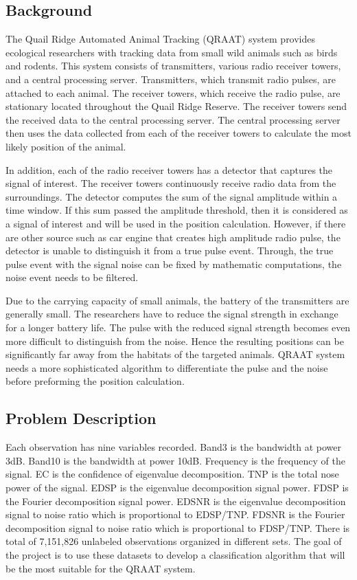 \documentclass[twoside]{article}
\begin{document}
\subsection{Background}
The Quail Ridge Automated Animal Tracking (QRAAT) system provides ecological researchers with tracking data from small wild animals such as birds and rodents. This system consists of transmitters, various radio receiver towers, and a central processing server. Transmitters, which transmit radio pulses, are attached to each animal. The receiver towers, which receive the radio pulse, are stationary located throughout the Quail Ridge Reserve. The receiver towers send the received data to the central processing server. The central processing server then uses the data collected from each of the receiver towers to calculate the most likely position of the animal. 

In addition, each of the radio receiver towers has a detector that captures the signal of interest. The receiver towers continuously receive radio data from the surroundings. The detector computes the sum of the signal amplitude within a time window. If this sum passed the amplitude threshold, then it is considered as a signal of interest and will be used in the position calculation. However, if there are other source such as car engine that creates high amplitude radio pulse, the detector is unable to distinguish it from a true pulse event. Through, the true pulse event with the signal noise can be fixed by mathematic computations, the noise event needs to be filtered.

Due to the carrying capacity of small animals, the battery of the transmitters are generally small. The researchers have to reduce the signal strength in exchange for a longer battery life. The pulse with the reduced signal strength becomes even more difficult to distinguish from the noise. Hence the resulting positions can be significantly far away from the habitats of the targeted animals. QRAAT system needs a more sophisticated algorithm to differentiate the pulse and the noise before preforming the position calculation.



\subsection{Problem Description}
Each observation has nine variables recorded. Band3 is the bandwidth at power 3dB. Band10 is the bandwidth at power 10dB. Frequency is the frequency of the signal. EC is the confidence of eigenvalue decomposition. TNP is the total nose power of the signal. EDSP is the eigenvalue decomposition signal power. FDSP is the Fourier decomposition signal power. EDSNR is the eigenvalue decomposition signal to noise ratio which is proportional to EDSP/TNP. FDSNR is the Fourier decomposition signal to noise ratio which is proportional to FDSP/TNP. There is total of 7,151,826 unlabeled observations organized in different sets. The goal of the project is to use these datasets to develop a classification algorithm that will be the most suitable for the QRAAT system. 
\end{document}
